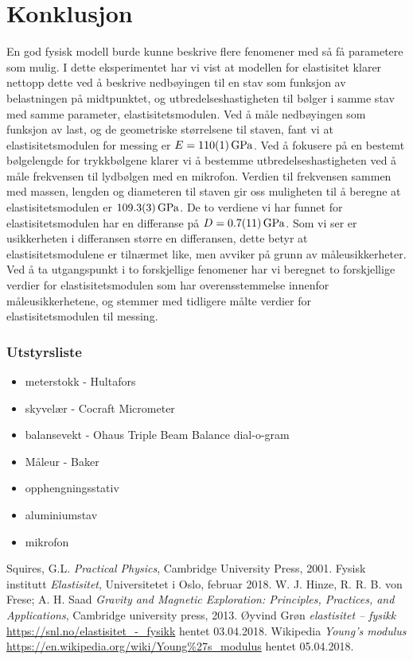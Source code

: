 \documentclass[%
 reprint,
 amsmath,amssymb,
 aps,
 norsk,
 booktabs
]{revtex4-1}
\begin{document}
\section{Konklusjon}
En god fysisk modell burde kunne beskrive flere fenomener med så få parametere som mulig. I dette eksperimentet har vi vist at modellen for elastisitet klarer nettopp dette ved å beskrive nedbøyingen til en stav som funksjon av belastningen på midtpunktet, og utbredelseshastigheten til bølger i samme stav med samme parameter, elastisitetsmodulen.
Ved å måle nedbøyingen som funksjon av last, og de geometriske størrelsene til staven, fant vi at elastisitetsmodulen for messing er $E=\SI{110\pm1}{\giga\pascal}$.
Ved å fokusere på en bestemt bølgelengde for trykkbølgene klarer vi å bestemme utbredelseshastigheten ved å måle frekvensen til lydbølgen med en mikrofon. Verdien til frekvensen sammen med massen, lengden og diameteren til staven gir oss muligheten til å beregne at elastisitetsmodulen er $\SI{109.3\pm0.3}{\giga\pascal}$.
De to verdiene vi har funnet for elastisitetsmodulen har en differanse på $D = \SI{0.7\pm1.1}{\giga\pascal}$. Som vi ser er usikkerheten i differansen større en differansen, dette betyr at elastisitetsmodulene er tilnærmet like, men avviker på grunn av måleusikkerheter. Ved å ta utgangspunkt i to forskjellige fenomener har vi beregnet to forskjellige verdier for elastisitetsmodulen som har overensstemmelse innenfor måleusikkerhetene, og stemmer med tidligere målte verdier for elastisitetsmodulen til messing.
\subsubsection*{Utstyrsliste}
\begin{itemize}
\label{utstyr}
\item meterstokk - Hultafors
\item skyvelær - Cocraft Micrometer
\item balansevekt - Ohaus Triple Beam Balance dial-o-gram
\item Måleur - Baker
\item opphengningsstativ
\item aluminiumstav
\item mikrofon
\end{itemize}
\begin{thebibliography}{9}
Squires, G.L. \emph{Practical Physics}, Cambridge University Press, 2001.
Fysisk institutt \emph{Elastisitet}, Universitetet i Oslo, februar 2018.
W. J. Hinze, R. R. B. von Frese; A. H. Saad \emph{Gravity and Magnetic Exploration: Principles, Practices, and Applications}, Cambridge university press, 2013.
Øyvind Grøn \emph{elastisitet – fysikk} \url{https://snl.no/elastisitet_-_fysikk} hentet 03.04.2018.
Wikipedia \emph{Young's modulus} \url{https://en.wikipedia.org/wiki/Young%27s_modulus} hentet 05.04.2018.
\end{thebibliography}
\end{document}
